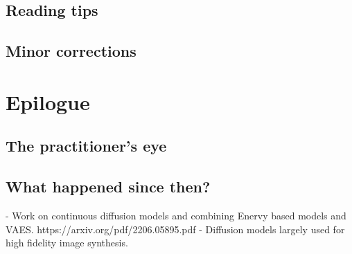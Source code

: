 \subsection{Reading tips}

\subsection{Minor corrections}



\section{Epilogue}
\subsection{The practitioner's eye}

\subsection{What happened since then?}
- Work on continuous diffusion models and combining Enervy based models and VAES.
https://arxiv.org/pdf/2206.05895.pdf
- Diffusion models largely used for high fidelity image synthesis.
